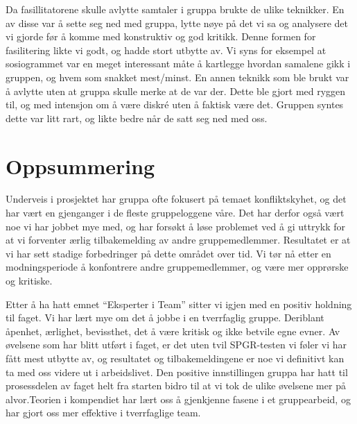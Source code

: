 \documentclass[a4paper,norsk,oneside]{article}
\begin{document}
Da fasillitatorene skulle avlytte samtaler i gruppa brukte de ulike teknikker. En av disse var å sette seg ned med gruppa, lytte nøye på det vi sa og analysere det vi gjorde før å komme med konstruktiv og god kritikk. Denne formen for fasilitering likte vi godt, og hadde stort utbytte av. Vi syns for eksempel at sosiogrammet var en meget interessant måte å kartlegge hvordan samalene gikk i gruppen, og hvem som snakket mest/minst.  En annen teknikk som ble brukt var å avlytte uten at gruppa skulle merke at de var der. Dette ble gjort med ryggen til, og med intensjon om å være diskré uten å faktisk være det. Gruppen syntes dette var litt rart, og likte bedre når de satt seg ned med oss.  

\section{Oppsummering}
Underveis i prosjektet har gruppa ofte fokusert på temaet konfliktskyhet, og det har vært en gjenganger i de fleste gruppeloggene våre. Det har derfor også vært noe vi har jobbet mye med, og har forsøkt å løse problemet ved å gi uttrykk for at vi forventer ærlig tilbakemelding av andre gruppemedlemmer. Resultatet er at vi har sett stadige forbedringer på dette området over tid. Vi tør nå etter en modningsperiode å konfontrere andre gruppemedlemmer, og være mer opprørske og kritiske.

Etter å ha hatt emnet “Eksperter i Team” sitter vi igjen med en positiv holdning til faget. Vi har lært mye om det å jobbe i en tverrfaglig gruppe. Deriblant åpenhet, ærlighet, bevissthet, det å være kritisk og ikke betvile egne evner. Av øvelsene som har blitt utført i faget, er det uten tvil SPGR-testen vi føler vi har fått mest utbytte av, og resultatet og tilbakemeldingene er noe vi definitivt kan ta med oss videre ut i arbeidslivet. Den positive innstillingen gruppa har hatt til prosessdelen av faget helt fra starten bidro til at vi tok de ulike øvelsene mer på alvor.Teorien i kompendiet har lært oss å gjenkjenne fasene i et gruppearbeid, og har gjort oss mer effektive i tverrfaglige team.

\clearpage



%
\end{document}
